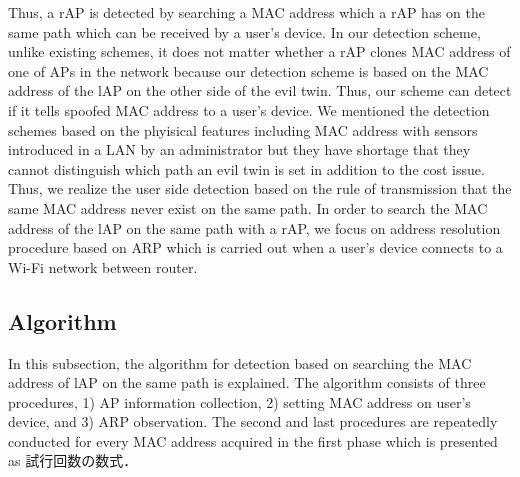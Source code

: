 \documentclass[conference]{IEEEtran}
\begin{document}
Thus, a rAP is detected by searching a MAC address which a rAP has on the same path which can be received by a user's device.
In our detection scheme, unlike existing schemes, it does not matter whether a rAP clones MAC address of one of APs in the network because our detection scheme is based on the MAC address of the lAP on the other side of the evil twin.
Thus, our scheme can detect if it tells spoofed MAC address to a user's device.
We mentioned the detection schemes based on the phyisical features including MAC address with sensors introduced in a LAN by an administrator but they have shortage that they cannot distinguish which path an evil twin is set in addition to the cost issue.
Thus, we realize the user side detection based on the rule of transmission that the same MAC address never exist on the same path.
In order to search the MAC address of the lAP on the same path with a rAP, we focus on address resolution procedure based on ARP which is carried out when a user's device connects to a Wi-Fi network between router.


\subsection{Algorithm}
In this subsection, the algorithm for detection based on searching the MAC address of lAP on the same path is explained.
The algorithm consists of three procedures, 1) AP information collection, 2) setting MAC address on user's device, and 3) ARP observation.
The second and last procedures are repeatedly conducted for every MAC address acquired in the first phase which is presented as 試行回数の数式．
\end{document}
